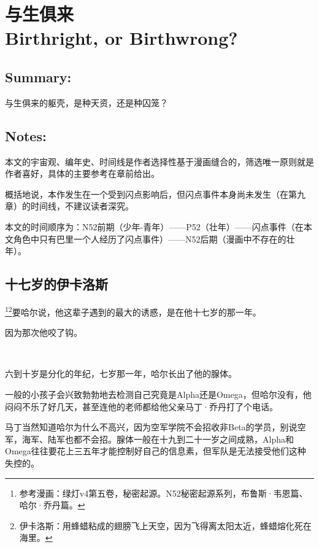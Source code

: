 \documentclass[../main]{subfiles}
\begin{document}
\pagestyle{mystyle}

\vspace{200em}

\chapter[与生俱来]{与生俱来 \\ Birthright, or Birthwrong?}

\vspace{3cm}

\section*{Summary:}

与生俱来的躯壳，是种天资，还是种囚笼？

\vspace{3em}

\section*{Notes:}

本文的宇宙观、编年史、时间线是作者选择性基于漫画缝合的，筛选唯一原则就是作者喜好，具体的主要参考在章前给出。

概括地说，本作发生在一个受到闪点影响后，但闪点事件本身尚未发生（在第九章）的时间线，不建议读者深究。

本文的时间顺序为：N52前期（少年-青年）——P52（壮年）——闪点事件（在本文角色中只有巴里一个人经历了闪点事件）——N52后期（漫画中不存在的壮年）。

\newpage

\section{十七岁的伊卡洛斯}

\footnote[1]{参考漫画：绿灯v4第五卷，秘密起源。N52秘密起源系列，布鲁斯·韦恩篇、哈尔·乔丹篇。}\footnote[2]{伊卡洛斯：用蜂蜡粘成的翅膀飞上天空，因为飞得离太阳太近，蜂蜡熔化死在海里。}要哈尔说，他这辈子遇到的最大的诱惑，是在他十七岁的那一年。

因为那次他咬了钩。

~\

六到十岁是分化的年纪，七岁那一年，哈尔长出了他的腺体。

一般的小孩子会兴致勃勃地去检测自己究竟是Alpha还是Omega，但哈尔没有，他闷闷不乐了好几天，甚至连他的老师都给他父亲马丁·乔丹打了个电话。

马丁当然知道哈尔为什么不高兴，因为空军学院不会招收非Beta的学员，别说空军，海军、陆军也都不会招。腺体一般在十九到二十一岁之间成熟，Alpha和Omega往往要花上三五年才能控制好自己的信息素，但军队是无法接受他们这种失控的。
\end{document}
